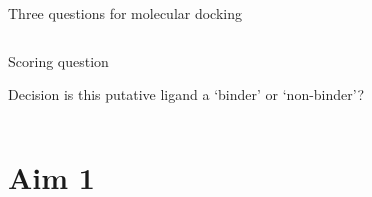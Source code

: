 \begin{frame}{Three questions for molecular docking}
\begin{columns}[T]
\begin{column}{.55\textwidth}
\begin{block}{Scoring question}
    \end{block}
    \pause
     \begin{block}{Decision}
is this putative ligand a `binder' or `non-binder'?
    \end{block}
\end{column}
    \end{columns}
\end{frame}


\section{Aim 1}
